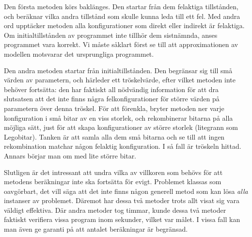 Den första metoden körs baklänges. Den startar från dem felaktiga
tillstånden, och beräknar vilka andra tillstånd som skulle kunna leda
till ett fel.
%
Med andra ord upptäcker metoden alla konfigurationer som direkt eller
indirekt är felaktiga.
%
Om initialtillstånden av programmet inte tillhör dem sistnämnda, anses
programmet vara korrekt. Vi måste såklart först se till att
approximationen av modellen motsvarar det ursprungliga programmet.

Den andra metoden startar från initialtillstånden. Den begränsar sig
till små värden av parametern, och härleder ett tröskelvärde, efter
vilket metoden inte behöver fortsätta: den har faktiskt all nödvändig
information för att dra slutsatsen att det inte finns några
felkonfigurationer för större värden på parametern över denna tröskel.
% 
För att förenkla, bryter metoden ner varje konfiguration i små bitar
av en viss storlek, och rekombinerar bitarna på alla möjliga sätt,
just för att skapa konfigurationer av större storlek (litegrann som
Lego\-bitar). %
% 
Tanken är att samla alla dem små bitarna och se till att ingen
rekombination matchar någon felaktig konfiguration.
% 
I så fall är tröskeln hittad. Annars börjar man om med lite större
bitar.


Slutligen är det intressant att undra vilka av villkoren som behövs
för att metodens beräkningar inte ska fortsätta för evigt. Problemet
klassas som oavgörbart, det vill säga att det inte finns någon
generell metod som kan lösa \emph{alla} instanser av
problemet. Däremot har dessa två metoder trots allt visat sig vara
väldigt effektiva.
%
Där andra metoder tog timmar, kunde dessa två metoder faktiskt
verifiera vissa program inom sekunder, vilket var målet.
%
I vissa fall kan man även ge garanti på att antalet beräkningar är
begränsad.

